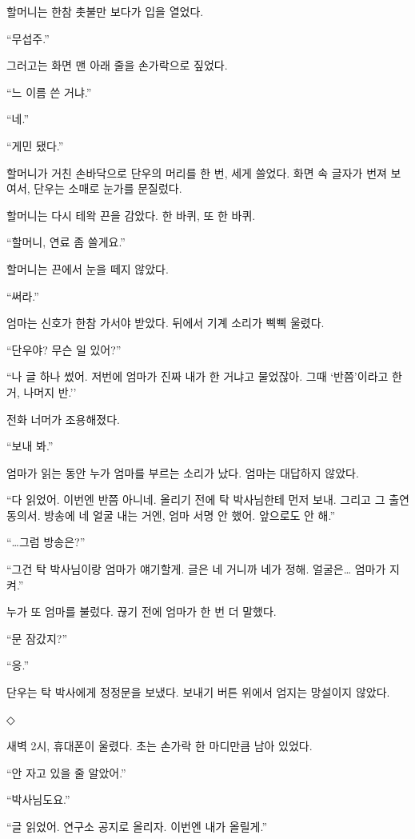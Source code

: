 \documentclass[
  korean,
  letterpaper,
  twoside,
  open=any,
  fontsize=12.5pt,
  headings=small]{scrbook}
\begin{document}
할머니는 한참 촛불만 보다가
입을 열었다.

``무섭주.''

그러고는 화면 맨 아래 줄을
손가락으로 짚었다.

``느 이름 쓴 거냐.''

``네.''

``게민 됐다.''

할머니가 거친 손바닥으로
단우의 머리를 한 번, 세게
쓸었다. 화면 속 글자가 번져
보여서, 단우는 소매로 눈가를
문질렀다.

할머니는 다시 테왁 끈을
감았다. 한 바퀴, 또 한 바퀴.

``할머니, 연료 좀 쓸게요.''

할머니는 끈에서 눈을 떼지
않았다.

``써라.''

엄마는 신호가 한참 가서야
받았다. 뒤에서 기계 소리가
삑삑 울렸다.

``단우야? 무슨 일 있어?''

``나 글 하나 썼어. 저번에
엄마가 진짜 내가 한 거냐고
물었잖아. 그때 `반쯤'이라고 한
거, 나머지 반.''

전화 너머가 조용해졌다.

``보내 봐.''

엄마가 읽는 동안 누가 엄마를
부르는 소리가 났다. 엄마는
대답하지 않았다.

``다 읽었어. 이번엔 반쯤
아니네. 올리기 전에 탁
박사님한테 먼저 보내. 그리고
그 출연 동의서. 방송에 네 얼굴
내는 거엔, 엄마 서명 안 했어.
앞으로도 안 해.''

``\ldots 그럼 방송은?''

``그건 탁 박사님이랑 엄마가
얘기할게. 글은 네 거니까 네가
정해. 얼굴은\ldots{} 엄마가
지켜.''

누가 또 엄마를 불렀다. 끊기
전에 엄마가 한 번 더 말했다.

``문 잠갔지?''

``응.''

단우는 탁 박사에게 정정문을
보냈다. 보내기 버튼 위에서
엄지는 망설이지 않았다.

\begin{center}◇\end{center}\nopagebreak

새벽 2시, 휴대폰이 울렸다.
초는 손가락 한 마디만큼 남아
있었다.

``안 자고 있을 줄 알았어.''

``박사님도요.''

``글 읽었어. 연구소 공지로
올리자. 이번엔 내가 올릴게.''
\end{document}
